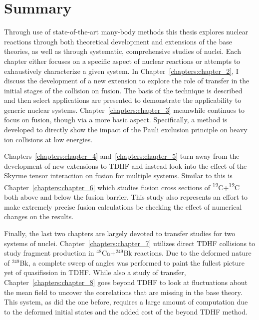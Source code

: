 \section{Summary}

Through use of state-of-the-art many-body methods this thesis explores nuclear reactions through both theoretical development and extensions of the base theories, as well as through systematic, comprehensive studies of nuclei.
Each chapter either focuses on a specific aspect of nuclear reactions or attempts to exhaustively characterize a given system.
In Chapter~\ref{chapters:chapter_2}, I discuss the development of a new extension to explore the role of transfer in the initial stages of the collision on fusion.
The basis of the technique is described and then select applications are presented to demonstrate the applicability to generic nuclear systems.
Chapter~\ref{chapters:chapter_3} meanwhile continues to focus on fusion, though via a more basic aspect.
Specifically, a method is developed to directly show the impact of the Pauli exclusion principle on heavy ion collisions at low energies.


Chapters~\ref{chapters:chapter_4} and~\ref{chapters:chapter_5} turn away from the development of new extensions to TDHF and instead look into the effect of the Skyrme tensor interaction on fusion for multiple systems.
Similar to this is Chapter~\ref{chapters:chapter_6} which studies fusion cross sections of \textsuperscript{12}C+\textsuperscript{12}C both above and below the fusion barrier.
This study also represents an effort to make extremely precise fusion calculations be checking the effect of numerical changes on the results.

Finally, the last two chapters are largely devoted to transfer studies for two systems of nuclei.
Chapter~\ref{chapters:chapter_7} utilizes direct TDHF collisions to study fragment production in $^{48}$Ca+$^{249}$Bk reactions.
Due to the deformed nature of $^{249}$Bk, a complete sweep of angles was performed to paint the fullest picture yet of quasifission in TDHF.
While also a study of transfer, Chapter~\ref{chapters:chapter_8} goes beyond TDHF to look at fluctuations about the mean field to uncover the correlations that are missing in the base theory.
This system, as did the one before, requires a large amount of computation due to the deformed initial states and the added cost of the beyond TDHF method.




\clearpage
